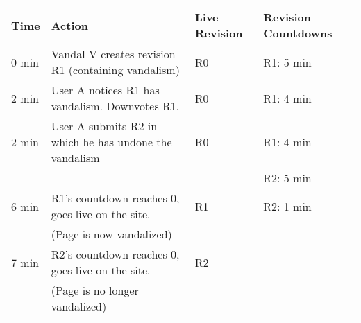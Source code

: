 \begin{tabular}{l|l|l|l}\hline
\textbf{Time} & \textbf{Action} & \textbf{Live Revision} & \textbf{Revision Countdowns} \\
\hline
0 min & Vandal V creates revision R1 (containing vandalism) & R0 & R1: 5 min \\
\hline
2 min & User A notices R1 has vandalism. Downvotes R1. & R0 & R1: 4 min \\
\hline
2 min & User A submits R2 in which he has undone the vandalism & R0 & R1: 4 min \\
 & & & R2: 5 min \\
\hline
6 min & R1's countdown reaches 0, goes live on the site.  & R1 & R2: 1 min\\
& (Page is now vandalized) & & \\
\hline
7 min & R2's countdown reaches 0, goes live on the site. & R2 & \\	
&  (Page is no longer vandalized) & & \\
\hline
\end{tabular}

